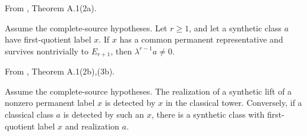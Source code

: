 \begin{theorem}
\label{sem:Literature:complete-lifetime}
From \cite{BHS}, Theorem A.1(2a).\par

Assume the complete-source hypotheses. Let $r\ge1$, and let a synthetic class $a$ have first-quotient label $x$. If $x$ has a common permanent representative and survives nontrivially to $E_{r+1}$, then $\lambda^{r-1}a\ne0$.
\end{theorem}

\begin{theorem}
\label{sem:Literature:complete-detection}
From \cite{BHS}, Theorem A.1(2b),(3b).\par

Assume the complete-source hypotheses. The realization of a synthetic lift of a nonzero permanent label $x$ is detected by $x$ in the classical tower. Conversely, if a classical class $a$ is detected by such an $x$, there is a synthetic class with first-quotient label $x$ and realization $a$.
\end{theorem}

